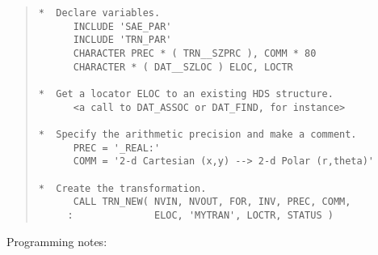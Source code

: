 \begin{quote}
\begin{tabbing} %

\verb#*  Declare variables.                                  #\\
\verb#      INCLUDE 'SAE_PAR'                                #\\
\verb#      INCLUDE 'TRN_PAR'                                #\\
\verb#      CHARACTER PREC * ( TRN__SZPRC ), COMM * 80       #\\
\verb#      CHARACTER * ( DAT__SZLOC ) ELOC, LOCTR           #\\
\verb#                                                       #\\
\verb#*  Get a locator ELOC to an existing HDS structure.    #\\
\verb#      <a call to DAT_ASSOC or DAT_FIND, for instance>  #\\
\verb#                                                       #\\
\verb#*  Specify the arithmetic precision and make a comment.#\\
\verb#      PREC = '_REAL:'                                  #\\
\verb#      COMM = '2-d Cartesian (x,y) --> 2-d Polar (r,theta)'#\\
\verb#                                                       #\\
\verb#*  Create the transformation.                          #\\
\verb#      CALL TRN_NEW( NVIN, NVOUT, FOR, INV, PREC, COMM, #\\
\verb#     :              ELOC, 'MYTRAN', LOCTR, STATUS )    #

\end{tabbing}
\end{quote}

Programming notes:

